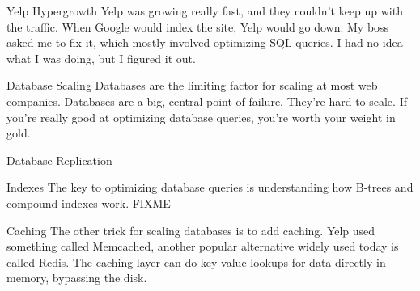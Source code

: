 \documentclass[14pt]{beamer}
\begin{document}
\begin{frame}{Yelp Hypergrowth}
  Yelp was growing really fast, and they couldn't keep up with the traffic. When
  Google would index the site, Yelp would go down.
  \newline
  \newline
  My boss asked me to fix it, which mostly involved optimizing SQL queries. I
  had no idea what I was doing, but I figured it out.
\end{frame}

\begin{frame}{Database Scaling}
  Databases are the limiting factor for scaling at most web companies.
  \newline
  \newline
  Databases are a big, central point of failure. They're hard to scale. If
  you're really good at optimizing database queries, you're worth your weight in
  gold.
\end{frame}

\begin{frame}{Database Replication}
\end{frame}

\begin{frame}{Indexes}
  The key to optimizing database queries is understanding how B-trees and
  compound indexes work.
  \newline
  \newline
  FIXME
\end{frame}

\begin{frame}{Caching}
  The other trick for scaling databases is to add caching. Yelp used something
  called Memcached, another popular alternative widely used today is called
  Redis.
  \newline
  \newline
  The caching layer can do key-value lookups for data directly in memory,
  bypassing the disk.
\end{frame}
\end{document}
